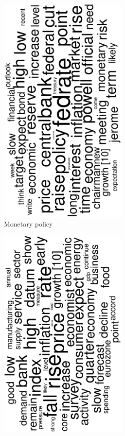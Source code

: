 \begin{figure}
\begin{subfigure}{0.32\textwidth}
		\includegraphics[width=0.7\textwidth,angle=270]{figures/wordcloud6.eps}
		\caption{Monetary policy}
	\end{subfigure}
	\begin{subfigure}{0.32\textwidth}
		\includegraphics[width=0.7\textwidth,angle=270]{figures/wordcloud8.eps}

\end{subfigure}
\end{figure}
